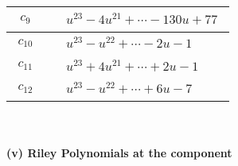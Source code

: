 \documentclass[1p]{elsarticle_modified}
\theoremstyle{definition}
\begin{document}
\begin{tabular}{m{50pt}|m{274pt}}
\hline $$\begin{aligned}c_{9}\end{aligned}$$&$\begin{aligned}
&u^{23}-4 u^{21}+\cdots-130 u+77
\end{aligned}$\\
\hline $$\begin{aligned}c_{10}\end{aligned}$$&$\begin{aligned}
&u^{23}- u^{22}+\cdots-2 u-1
\end{aligned}$\\
\hline $$\begin{aligned}c_{11}\end{aligned}$$&$\begin{aligned}
&u^{23}+4 u^{21}+\cdots+2 u-1
\end{aligned}$\\
\hline $$\begin{aligned}c_{12}\end{aligned}$$&$\begin{aligned}
&u^{23}- u^{22}+\cdots+6 u-7
\end{aligned}$\\
\hline
\end{tabular}\\~\\
\newpage\renewcommand{\arraystretch}{1}
\flushleft \textbf{(v) Riley Polynomials at the component}\newline \\
\end{document}
